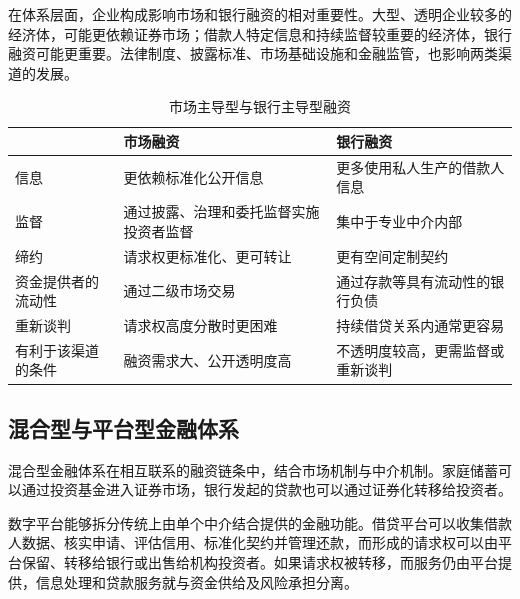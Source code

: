在体系层面，企业构成影响市场和银行融资的相对重要性。大型、透明企业较多的经济体，可能更依赖证券市场；借款人特定信息和持续监督较重要的经济体，银行融资可能更重要。法律制度、披露标准、市场基础设施和金融监管，也影响两类渠道的发展。

\begin{table}[htbp]
\centering
\caption{市场主导型与银行主导型融资}
\label{tab:ch4-market-bank}

\renewcommand{\arraystretch}{1.15}

\begin{tabularx}{\textwidth}{
@{}
>{\raggedright\arraybackslash}p{3.0cm}
>{\raggedright\arraybackslash}X
>{\raggedright\arraybackslash}X
@{}
}

\toprule
& \textbf{市场融资}
& \textbf{银行融资} \\
\midrule

信息
& 更依赖标准化公开信息
& 更多使用私人生产的借款人信息 \\

监督
& 通过披露、治理和委托监督实施投资者监督
& 集中于专业中介内部 \\

缔约
& 请求权更标准化、更可转让
& 更有空间定制契约 \\

资金提供者的流动性
& 通过二级市场交易
& 通过存款等具有流动性的银行负债 \\

重新谈判
& 请求权高度分散时更困难
& 持续借贷关系内通常更容易 \\

有利于该渠道的条件
& 融资需求大、公开透明度高
& 不透明度较高，更需监督或重新谈判 \\

\bottomrule
\end{tabularx}
\end{table}

\subsection{混合型与平台型金融体系}

混合型金融体系在相互联系的融资链条中，结合市场机制与中介机制。家庭储蓄可以通过投资基金进入证券市场，银行发起的贷款也可以通过证券化转移给投资者。

数字平台能够拆分传统上由单个中介结合提供的金融功能。借贷平台可以收集借款人数据、核实申请、评估信用、标准化契约并管理还款，而形成的请求权可以由平台保留、转移给银行或出售给机构投资者。如果请求权被转移，而服务仍由平台提供，信息处理和贷款服务就与资金供给及风险承担分离。

